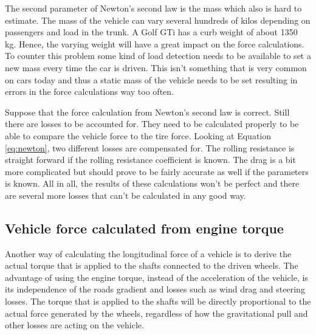 The second parameter of Newton's second law is the mass which also is hard to estimate. The mass of the vehicle can vary several hundreds of kilos depending on passengers and load in the trunk. A Golf GTi has a curb weight of about 1350 kg. Hence, the varying weight will have a great impact on the force calculations. To counter this problem some kind of load detection needs to be available to set a new mass every time the car is driven. This isn't something that is very common on cars today and thus a static mass of the vehicle needs to be set resulting in errors in the force calculations way too often.

Suppose that the force calculation from Newton's second law is correct. Still there are losses to be accounted for. They need to be calculated properly to be able to compare the vehicle force to the tire force. Looking at Equation \ref{eq:newton}, two different losses are compensated for. The rolling resistance is straight forward if the rolling resistance coefficient is known. The drag is a bit more complicated but should prove to be fairly accurate as well if the parameters is known. All in all, the results of these calculations won't be perfect and there are several more losses that can't be calculated in any good way.


\subsection{Vehicle force calculated from engine torque}
Another way of calculating the longitudinal force of a vehicle is to derive the actual torque that is applied to the shafts connected to the driven wheels. The advantage of using the engine torque, instead of the acceleration of the vehicle, is its independence of the roads gradient and losses such as wind drag and steering losses. The torque that is applied to the shafts will be directly proportional to the actual force generated by the wheels, regardless of how the gravitational pull and other losses are acting on the vehicle. 

